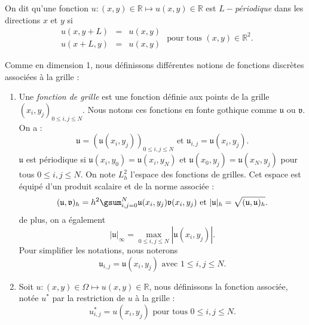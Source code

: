On dit qu'une fonction $u : (x,y) \in \mathbb{R} \mapsto u(x,y) \in \mathbb{R}$ est $L-$\textit{périodique} dans les directions $x$ et $y$ si 
\begin{equation}
\begin{array}{rcl}
u(x,y+L) & = & u(x,y) \\
u(x+L,y) & = & u(x,y)
\end{array} \text{ pour tous } (x,y) \in \mathbb{R}^2.
\end{equation}

Comme en dimension 1, nous définissons différentes notions de fonctions discrètes associées à la grille :
\begin{enumerate}
\item Une \textit{fonction de grille} est une fonction définie aux points de la grille $(x_i,y_j)_{0 \leq i,j \leq N}$. Nous notons ces fonctions en fonte gothique comme $\mathfrak{u}$ ou $\mathfrak{v}$. On a :
\begin{equation}
\mathfrak{u} = \left( \mathfrak{u}(x_i,y_j) \right)_{0 \leq i,j \leq N} \text{ et } \mathfrak{u}_{i,j} = \mathfrak{u}(x_i,y_j).
\end{equation}
$\mathfrak{u}$ est périodique si $\mathfrak{u}(x_{i},y_0) = \mathfrak{u}(x_{i},y_N)$ et $\mathfrak{u}(x_{0},y_j) = \mathfrak{u}(x_{N},y_j)$ pour tous $0 \leq i,j \leq N$.
On note $L^2_h$ l'espace des fonctions de grilles. Cet espace est équipé d'un produit scalaire et de la norme associée :
\begin{equation}
(\mathfrak{u}, \mathfrak{v})_h = h^2 \gsum_{i,j=0}^N \mathfrak{u}(x_i,y_j) \mathfrak{v}(x_i,y_j) \text{ et } |\mathfrak{u}|_h = \sqrt{(\mathfrak{u},\mathfrak{u})_h}.
\end{equation}
de plus, on a également
\begin{equation}
| \mathfrak{u} |_{\infty} = \max_{0 \leq i,j \leq N} |\mathfrak{u}(x_i,y_j)|.
\end{equation}
Pour simplifier les notations, nous noterons
\begin{equation}
\mathfrak{u}_{i,j} = \mathfrak{u}(x_i, y_j) \text{ avec } 1 \leq i,j \leq N.
\end{equation}

\item Soit $u : (x,y) \in \Omega \mapsto u(x,y) \in \mathbb{R}$, nous définissons la fonction associée, notée $u^*$ par la restriction de $u$ à la grille :
\begin{equation}
u^*_{i,j} = u(x_i, y_j) \text{ pour tous } 0 \leq i,j \leq N.
\end{equation}


\end{enumerate}
